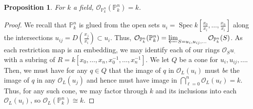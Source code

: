 \documentclass[english,letter,doublesided]{article}
\DeclareMathOperator{\spec}{Spec}
\newcommand{\OO}{\mathcal{O}}
\newcommand{\PP}{\mathbb{P}}
\newcommand{\prob}[1]{\setcounter{section}{#1-1}\section{}}
\newtheorem*{prop*}{Proposition}
\theoremstyle{remark}
\theoremstyle{definition}
\newcommand{\clim}{\varprojlim}
\newcommand{\fv}[2]{\frac{x_{#1}}{x_{#2}}}
\begin{document}
%
%
%
%
%
%
\prob{6}
\begin{prop*} For $k$ a field, 
	$\OO_{\PP_k^n}(\PP_k^n)=k$.
\end{prop*}
\begin{proof}
	We recall that $\PP_k^n$ is glued from the open sets $u_i=\spec k[\fv{0}{i},\hdots,\fv{n}{i}]$ along the intersections $u_{ij}=D(\fv{j}{i})\subset u_i$. Thus, $\OO_{\PP_k^n}(\PP_k^n)=\clim_{S=u_i,u_{ij},\hdots} \OO_{\PP_k^n}(S)$. As each restriction map is an embedding, we may identify each of our rings $\OO_{S}u_{\cdot}$ with a subring of $R=k[x_0,\hdots,x_n,x_0^{-1},\hdots,x_{n}^{-1}]$. We let $Q$ be a cone for $u_i,u_{ij},\hdots$. Then, we must have for any $q\in Q$ that the image of $q$ in $\OO_{L}(u_i)$ must \textit{be} the image of $q$ in any $\OO_L(u_j)$ and hence must have image in $\bigcap_{\ell=0}^n \OO_L(u_\ell)=k$. Thus, for any such cone, we may factor through $k$ and its inclusions into each $\OO_L(u_i)$, so $\OO_L(\PP^n_k)\cong k$.
\end{proof}
%
%
%
\end{document}
